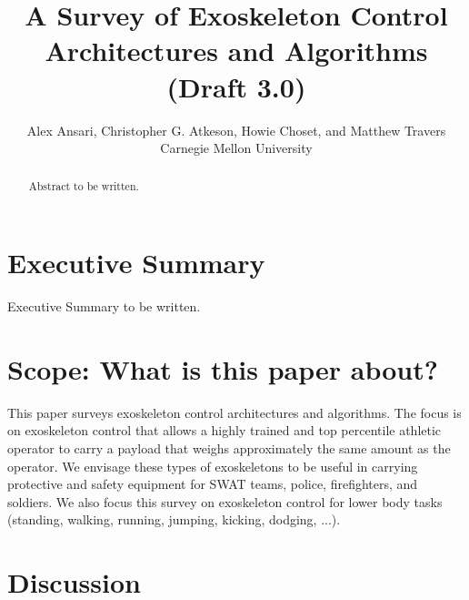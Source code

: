\documentclass[letterpaper,12pt,fullpage]{article}
\begin{document}
\title{A Survey of Exoskeleton Control Architectures and
Algorithms\\
(Draft 3.0)}

\author{Alex Ansari, Christopher G. Atkeson, Howie Choset, and Matthew Travers\\
Carnegie Mellon University}

\maketitle

\begin{abstract}
Abstract to be written.
\end{abstract}

\section{Executive Summary}

Executive Summary to be written.

\section{Scope: What is this paper about?}

This paper surveys exoskeleton control architectures and
algorithms.
The focus is on exoskeleton control that allows a
highly trained and top percentile athletic 
operator to carry a payload that weighs approximately the same amount
as the operator. We envisage these types of exoskeletons to be useful
in carrying protective and safety equipment for SWAT teams, police,
firefighters, and soldiers. 
We also 
focus this survey on exoskeleton control for lower body tasks (standing, walking,
running, jumping, kicking, dodging, ...).

















% 


\section{Discussion}
\end{document}
